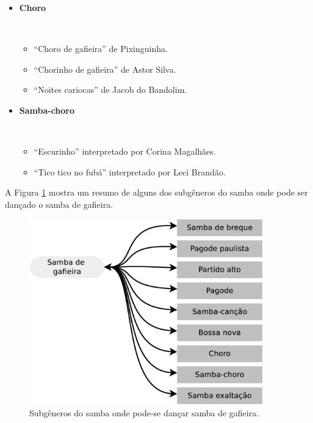 \begin{itemize}
\item \textbf{Choro}
\begin{example} ~
\begin{itemize}
\item ``Choro de gafieira'' de Pixinguinha.
\item ``Chorinho de gafieira'' de Astor Silva.
\item ``Noites cariocas'' de Jacob do Bandolim.
\end{itemize}
\end{example} 


\item \textbf{Samba-choro}
\begin{example} ~
\begin{itemize}
\item ``Escurinho'' interpretado por Corina Magalhães.
\item ``Tico tico no fubá'' interpretado por Leci Brandão.
\end{itemize}
\end{example}

\end{itemize}

A Figura \ref{fig:gafieiradancaestilos} mostra um resumo de alguns dos 
subgêneros do samba onde pode ser dançado o samba de gafieira.
\begin{figure}[h]
  \centering
    \includegraphics[width=0.9\textwidth]{chapters/cap-historia-sambagafieira/gafieiravcmusica.eps}
  \caption{ Subgêneros do samba onde pode-se dançar samba de gafieira.}
\label{fig:gafieiradancaestilos}
\end{figure}

